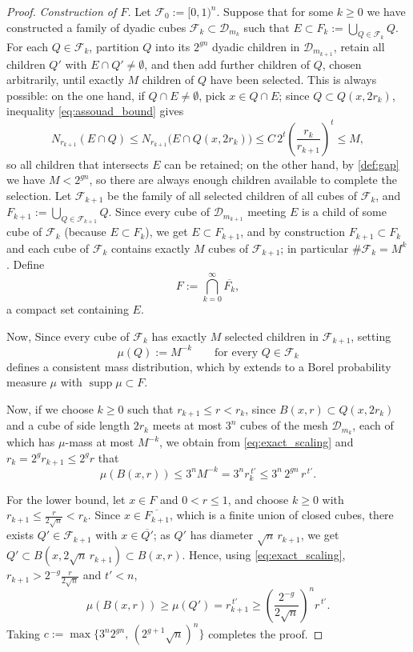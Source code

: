 \documentclass[12pt]{amsart}
\theoremstyle{definition}
\theoremstyle{remark}
\numberwithin{equation}{section}
\begin{document}
\begin{proof}
\emph{Construction of $F$.} Let $\mathcal{F}_0:=[0,1)^n$. Suppose
that for some $k\geq 0$ we have constructed a family of dyadic cubes
$\mathcal{F}_k\subset\mathcal{D}_{m_k}$ such that
$E\subset F_k:=\bigcup_{Q\in\mathcal{F}_k}Q$. For each
$Q\in\mathcal{F}_k$, partition $Q$ into its $2^{gn}$ dyadic children in
$\mathcal{D}_{m_{k+1}}$, retain all children $Q'$ with
$E\cap Q'\neq\emptyset$, and then add further children of $Q$, chosen
arbitrarily, until exactly $M$ children of $Q$ have been selected. This
is always possible: on the one hand, if $Q\cap E\neq\emptyset$, pick
$x\in Q\cap E$; since $Q\subset Q(x,2r_k)$, inequality
\eqref{eq:assouad_bound} gives
\begin{equation}\label{ineq:children}
    N_{r_{k+1}}(E\cap Q)
    \leq N_{r_{k+1}}\bigl(E\cap Q(x,2r_k)\bigr)
    \leq C\,2^t\left(\frac{r_k}{r_{k+1}}\right)^{t}\leq M,
\end{equation}
so all children that intersects $E$ can be retained; on the other hand, by
\eqref{def:gap} we have $M<2^{gn}$, so there are always enough children
available to complete the selection. Let $\mathcal{F}_{k+1}$ be the
family of all selected children of all cubes of $\mathcal{F}_k$, and
$F_{k+1}:=\bigcup_{Q\in\mathcal{F}_{k+1}}Q$. Since every cube of
$\mathcal{D}_{m_{k+1}}$ meeting $E$ is a child of some cube of
$\mathcal{F}_k$ (because $E\subset F_k$), we get $E\subset F_{k+1}$, and
by construction $F_{k+1}\subset F_k$ and each cube of $\mathcal{F}_k$
contains exactly $M$ cubes of $\mathcal{F}_{k+1}$; in particular
$\#\mathcal{F}_k=M^k$. Define
\[
F := \bigcap_{k=0}^{\infty} \overline{F_k},
\]
a compact set containing $E$.

Now, Since every cube of $\mathcal{F}_k$ has exactly $M$
selected children in $\mathcal{F}_{k+1}$, setting
\[
\mu(Q):=M^{-k}\qquad \text{for every }Q\in\mathcal{F}_k
\]
defines a consistent mass distribution, which by \cite[Proposition 1.7]{falconer2013fractal} extends to a Borel
probability measure $\mu$ with $\operatorname{supp}\mu\subset F$.

Now, if we  choose $k\geq 0$ such that
$r_{k+1}\leq r<r_k$, since $B(x,r)\subset Q(x,2r_k)$ and a cube of side
length $2r_k$ meets at most $3^n$ cubes of the mesh $\mathcal{D}_{m_k}$,
each of which has $\mu$-mass at most $M^{-k}$, we obtain from
\eqref{eq:exact_scaling} and $r_k=2^g r_{k+1}\leq 2^g r$ that
$$\mu(B(x,r))\leq 3^n M^{-k}=3^n r_k^{\,t'}\leq 3^n\,2^{gn}\, r^{\,t'}.$$


For the lower bound, let $x\in F$ and $0<r\leq 1$, and choose $k\geq 0$
with $r_{k+1}\leq \frac{r}{2\sqrt n}<r_k$. Since
$x\in\overline{F_{k+1}}$, which is a finite union of closed cubes, there
exists $Q'\in\mathcal{F}_{k+1}$ with $x\in\overline{Q'}$; as $Q'$ has
diameter $\sqrt n\, r_{k+1}$, we get
$Q'\subset B(x,2\sqrt n\, r_{k+1})\subset B(x,r)$. Hence, using
\eqref{eq:exact_scaling}, $r_{k+1}>2^{-g}\frac{r}{2\sqrt n}$ and
$t'<n$,
$$\mu(B(x,r))\geq \mu(Q')=r_{k+1}^{\,t'}
\geq \left(\frac{2^{-g}}{2\sqrt n}\right)^{n} r^{\,t'}.$$
Taking $c:=\max\{3^n 2^{gn},\,(2^{g+1}\sqrt n)^{n}\}$ completes the
proof.
\end{proof}
\end{document}
